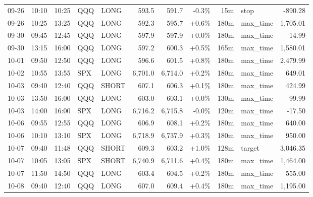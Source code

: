 \documentclass[11pt,a4paper,twoside]{article}
\begin{document}
\begin{center}
\begin{longtable}{>{\color{txtmain}}l l l l l r r r r >{\color{txtmain}}l r}
09-26 & 10:10 & 10:25 & QQQ & LONG & 593.5 & 591.7 & \textcolor{lossred}{-0.3\%} & 15m & stop & \textcolor{lossred}{-890.28} \\
09-26 & 10:25 & 13:25 & QQQ & LONG & 592.3 & 595.7 & \textcolor{wingreen}{+0.6\%} & 180m & max\_time & \textcolor{wingreen}{1,705.01} \\
09-30 & 09:45 & 12:45 & QQQ & LONG & 597.9 & 597.9 & \textcolor{wingreen}{+0.0\%} & 180m & max\_time & \textcolor{wingreen}{14.99} \\
09-30 & 13:15 & 16:00 & QQQ & LONG & 597.2 & 600.3 & \textcolor{wingreen}{+0.5\%} & 165m & max\_time & \textcolor{wingreen}{1,580.01} \\
10-01 & 09:50 & 12:50 & QQQ & LONG & 596.6 & 601.5 & \textcolor{wingreen}{+0.8\%} & 180m & max\_time & \textcolor{wingreen}{2,479.99} \\
10-02 & 10:55 & 13:55 & SPX & LONG & 6,701.0 & 6,714.0 & \textcolor{wingreen}{+0.2\%} & 180m & max\_time & \textcolor{wingreen}{649.01} \\
10-03 & 09:40 & 12:40 & QQQ & SHORT & 607.1 & 606.3 & \textcolor{wingreen}{+0.1\%} & 180m & max\_time & \textcolor{wingreen}{424.99} \\
10-03 & 13:50 & 16:00 & QQQ & LONG & 603.0 & 603.1 & \textcolor{wingreen}{+0.0\%} & 130m & max\_time & \textcolor{wingreen}{99.99} \\
10-03 & 14:00 & 16:00 & SPX & LONG & 6,716.2 & 6,715.8 & \textcolor{lossred}{-0.0\%} & 120m & max\_time & \textcolor{lossred}{-17.50} \\
10-06 & 09:55 & 12:55 & QQQ & LONG & 606.9 & 608.1 & \textcolor{wingreen}{+0.2\%} & 180m & max\_time & \textcolor{wingreen}{640.00} \\
10-06 & 10:10 & 13:10 & SPX & LONG & 6,718.9 & 6,737.9 & \textcolor{wingreen}{+0.3\%} & 180m & max\_time & \textcolor{wingreen}{950.00} \\
10-07 & 09:40 & 11:48 & QQQ & SHORT & 609.3 & 603.2 & \textcolor{wingreen}{+1.0\%} & 128m & target & \textcolor{wingreen}{3,046.35} \\
10-07 & 10:05 & 13:05 & SPX & SHORT & 6,740.9 & 6,711.6 & \textcolor{wingreen}{+0.4\%} & 180m & max\_time & \textcolor{wingreen}{1,464.00} \\
10-07 & 11:50 & 14:50 & QQQ & LONG & 603.4 & 604.5 & \textcolor{wingreen}{+0.2\%} & 180m & max\_time & \textcolor{wingreen}{555.00} \\
10-08 & 09:40 & 12:40 & QQQ & LONG & 607.0 & 609.4 & \textcolor{wingreen}{+0.4\%} & 180m & max\_time & \textcolor{wingreen}{1,195.00} \\

\end{longtable}
\end{center}
\end{document}
